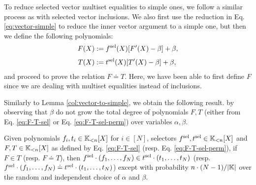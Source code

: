 To reduce selected vector multiset equalities to simple ones, we follow a similar process as with selected vector inclusions. We also first use the reduction in Eq. \eqref{eq:vector-simple} to reduce the inner vector argument to a simple one, but then we define the following polynomials:
\begin{align}\label{eq:F-T-sel-perm}
  \begin{split}
  F(X) &:= f^{\text{sel}}(X) [F'(X) - \beta] + \beta,\\[0.1cm]
  T(X) &:= t^{\text{sel}}(X) [T'(X) - \beta] + \beta, 
\end{split}
\end{align}
and proceed to prove the relation $F \doteq T$. Here, we have been able to first define $F$ since we are dealing with multiset equalities instead of inclusions.

Similarly to Lemma \ref{col:vector-to-simple}, we obtain the following result. 
by observing that $\beta$ do not grow the total degree of polynomials $F, T$ (either from Eq. \eqref{eq:F-T-sel} or Eq. \eqref{eq:F-T-sel-perm}) over variables $\alpha,\beta$.
\begin{lemma}\label{col:svector-to-simple}
  Given polynomials $f_i,t_i \in \mathbb{K}_{<n}[X]$ for $i\in[N]$, selectors $f^{\text{sel}},t^{\text{sel}} \in \mathbb{K}_{<n}[X]$ and $F,T \in \mathbb{K}_{<n}[X]$ as defined by Eq. \eqref{eq:F-T-sel} (resp. Eq. \eqref{eq:F-T-sel-perm}), if $F \in T$ (resp. $F \doteq T$), then $f^{\text{sel}} \cdot (f_1,\dots,f_N) \in t^{\text{sel}} \cdot (t_1,\dots,t_N)$ (resp. $f^{\text{sel}} \cdot (f_1,\dots,f_N) \doteq t^{\text{sel}} \cdot (t_1,\dots,t_N)$) except with probability $n \cdot (N-1)/|\mathbb{K}|$ over the random and independent choice of $\alpha$ and $\beta$.
\end{lemma}

